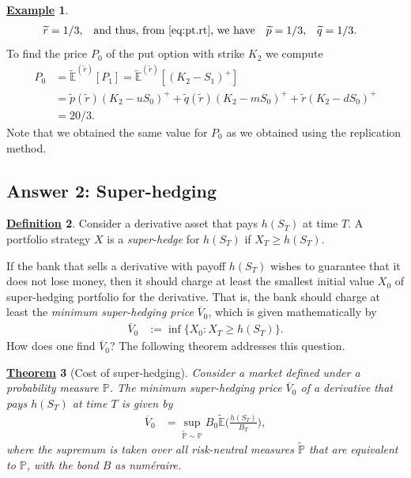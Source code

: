 \documentclass[12pt]{book}
\numberwithin{equation}{chapter}
\theoremstyle{plain}
\newtheorem{theorem}{\underline{Theorem}}
\numberwithin{theorem}{section}
\theoremstyle{definition}
\newtheorem{definition}[theorem]{\underline{Definition}}
\newtheorem{example}[theorem]{\underline{Example}}
\numberwithin{exercise}{chapter}
\newcommand{\<}{\langle}
\renewcommand{\>}{\rangle}
\renewcommand{\(}{\left(}
\renewcommand{\)}{\right)}
\renewcommand{\[}{\left[}
\renewcommand{\]}{\right]}
\newcommand\Eb{\mathds{E}}
\newcommand\Pb{\mathds{P}}
\newcommand\Ebt{\widetilde{\Eb}}
\newcommand\Pbt{\widetilde{\Pb}}
\newcommand\qt{\widetilde{q}}
\newcommand\rt{\widetilde{r}}
\theoremstyle{definition}
\numberwithin{question}{section}
\newcommand\pt{\widetilde{p}}
\begin{document}
\begin{example}
\begin{align}
\rt
	&=	1/3 , &
	&\text{and thus, from \eqref{eq:pt.rt}, we have} &
\pt
	&=	1/3 , &
\qt
	&=	1/3 .
\end{align}
To find the price $P_0$ of the put option with strike $K_2$ we compute
\begin{align}
P_0
	&=	\Ebt^{(\rt)}[ P_1 ] = \Ebt^{(\rt)}[ (K_2 - S_1)^+ ]\\
	&=	\pt(\rt) ( K_2 - u S_0 )^+ + \qt(\rt) ( K_2 - m S_0 )^+ + \rt ( K_2 - d S_0 )^+ \\
	&=	20/3 .
\end{align}
Note that we obtained the same value for $P_0$ as we obtained using the replication method.
\end{example}

\subsection{Answer 2: Super-hedging}

\begin{definition}
Consider a derivative asset that pays $h(S_T)$ at time $T$.
A portfolio strategy $X$ is a \textit{super-hedge} for $h(S_T)$ if $X_T \geq h(S_T)$.
\end{definition}

\noindent
If the bank that sells a derivative with payoff $h(S_T)$ wishes to guarantee that it does not lose money, then it should charge at least the smallest initial value $X_0$ of super-hedging portfolio for the derivative.  That is, the bank should charge at least the \textit{minimum super-hedging price} $\overline{V}_0$, which is given mathematically by
\begin{align}
\overline{V}_0
	&:=	\inf \{ X_0 : X_T \geq h(S_T) \} . \label{def:superhedge}
\end{align}
How does one find $\overline{V}_0$?  The following theorem addresses this question.

\begin{theorem}[Cost of super-hedging] \label{thm:superhedge}
Consider a market defined under a probability measure $\Pb$.  
The minimum super-hedging price $\overline{V}_0$ of a derivative that pays $h(S_T)$ at time $T$ is given by
\begin{align}
\overline{V}_0
	&=	\sup_{\Pbt \sim \Pb} B_0 \Ebt \Big( \frac{h(S_T)}{B_T} \Big) , \label{eq:superhedge}
\end{align}
where the supremum is taken over all risk-neutral measures $\Pbt$ that are equivalent to $\Pb$, with the bond $B$ as num\'eraire.
\end{theorem}
\end{document}
